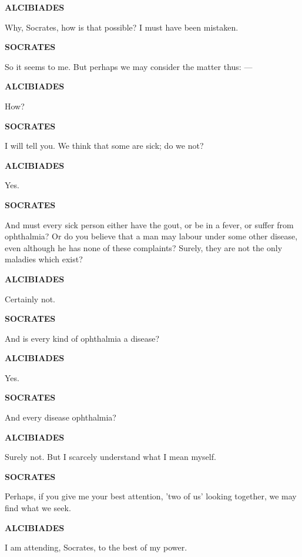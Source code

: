 \documentclass[11pt,letter]{article}
\begin{document}
\par \textbf{ALCIBIADES}
\par   Why, Socrates, how is that possible? I must have been mistaken.

\par \textbf{SOCRATES}
\par   So it seems to me. But perhaps we may consider the matter thus: —

\par \textbf{ALCIBIADES}
\par   How?

\par \textbf{SOCRATES}
\par   I will tell you. We think that some are sick; do we not?

\par \textbf{ALCIBIADES}
\par   Yes.

\par \textbf{SOCRATES}
\par   And must every sick person either have the gout, or be in a fever, or suffer from ophthalmia? Or do you believe that a man may labour under some other disease, even although he has none of these complaints? Surely, they are not the only maladies which exist?

\par \textbf{ALCIBIADES}
\par   Certainly not.

\par \textbf{SOCRATES}
\par   And is every kind of ophthalmia a disease?

\par \textbf{ALCIBIADES}
\par   Yes.

\par \textbf{SOCRATES}
\par   And every disease ophthalmia?

\par \textbf{ALCIBIADES}
\par   Surely not. But I scarcely understand what I mean myself.

\par \textbf{SOCRATES}
\par   Perhaps, if you give me your best attention, 'two of us' looking together, we may find what we seek.

\par \textbf{ALCIBIADES}
\par   I am attending, Socrates, to the best of my power.
\end{document}
